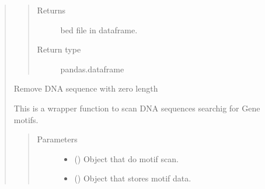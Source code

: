 \documentclass[letterpaper,10pt,english]{sphinxmanual}
\begin{document}
\begin{quote}
\begin{fulllineitems}
\begin{quote}
\begin{description}
\item[{Returns}] \leavevmode
bed file in dataframe.

\item[{Return type}] \leavevmode
pandas.dataframe

\end{description}\end{quote}

\end{fulllineitems}


\begin{fulllineitems}
\label{\detokenize{modules/celloracle.motif_analysis:celloracle.motif_analysis.remove_zero_seq}}
Remove DNA sequence with zero length

\end{fulllineitems}


\begin{fulllineitems}
\label{\detokenize{modules/celloracle.motif_analysis:celloracle.motif_analysis.scan_dna_for_motifs}}
This is a wrapper function to scan DNA sequences searchig for Gene motifs.
\begin{quote}\begin{description}
\item[{Parameters}] \leavevmode\begin{itemize}
\item {} 
 () \textendash{} Object that do motif scan.

\item {} 
 () \textendash{} Object that stores motif data.


\end{itemize}
\end{description}
\end{quote}
\end{fulllineitems}
\end{quote}
\end{document}
